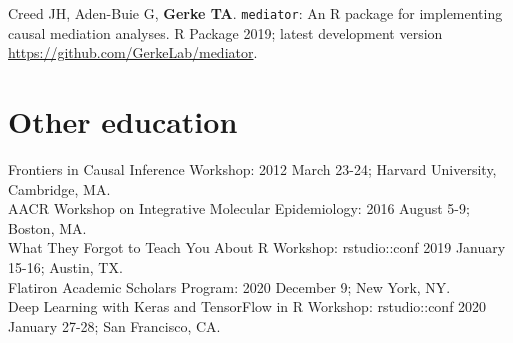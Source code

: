 \documentclass[11pt, a4paper]{article} %
\begin{document}
Creed JH, Aden-Buie G, {\bf Gerke TA}. \verb|mediator|: An R package for implementing causal mediation analyses. R Package 2019; latest development version \\\href{https://github.com/GerkeLab/mediator}{https://github.com/GerkeLab/mediator}.

\section*{Other education}
Frontiers in Causal Inference Workshop: 2012 March 23-24; Harvard University, Cambridge, MA.\\

AACR Workshop on Integrative Molecular Epidemiology: 2016 August 5-9; Boston, MA.\\

What They Forgot to Teach You About R Workshop: rstudio::conf 2019 January 15-16; Austin, TX.\\

Flatiron Academic Scholars Program: 2020 December 9; New York, NY.\\

Deep Learning with Keras and TensorFlow in R Workshop: rstudio::conf 2020 January 27-28; San Francisco, CA.


\end{document}
